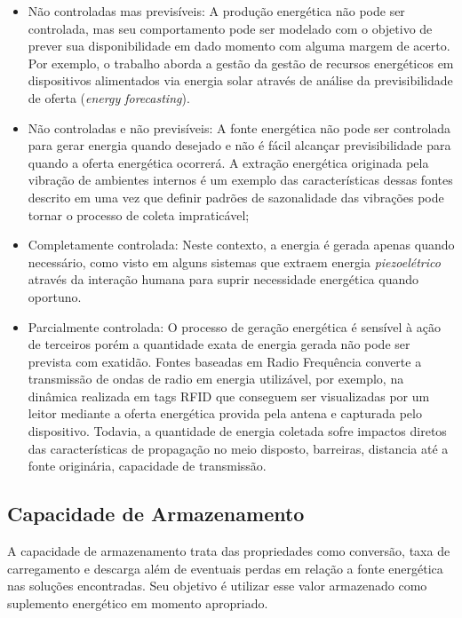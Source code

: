 \begin{itemize}

    \item Não controladas mas previsíveis: A produção energética não pode ser controlada, mas seu comportamento pode ser modelado com o objetivo de prever sua disponibilidade em dado momento com alguma margem de acerto. Por exemplo, o trabalho  \cite{lee_energy_2018} aborda a gestão da gestão de recursos energéticos em dispositivos alimentados via energia solar através de análise da previsibilidade de oferta (\textit{energy forecasting}).
    
    
    \item Não controladas e não previsíveis: A fonte energética não pode ser controlada para gerar energia quando desejado e não é fácil alcançar previsibilidade para quando a oferta energética ocorrerá. A extração energética originada pela vibração de ambientes internos é um exemplo das características dessas fontes descrito em \cite{wei_comprehensive_2017} uma vez que definir padrões de sazonalidade das vibrações pode tornar o processo de coleta impraticável;
    
    \item Completamente controlada: Neste contexto, a energia é gerada apenas quando necessário, como visto em alguns sistemas que extraem energia \textit{piezoelétrico} através da interação humana para suprir necessidade energética quando oportuno.
    
    \item Parcialmente controlada: O processo de geração energética é sensível à ação de terceiros porém a quantidade exata de energia gerada não pode ser prevista com exatidão. Fontes baseadas em Radio Frequência converte a transmissão de ondas de radio em energia utilizável, por exemplo, na dinâmica realizada em tags \acf{RFID} que conseguem ser visualizadas por um leitor mediante a oferta energética provida pela antena e capturada pelo dispositivo. Todavia, a quantidade de energia coletada sofre impactos diretos das características de propagação no meio disposto, barreiras, distancia até a fonte originária, capacidade de transmissão.
\end{itemize}

\subsection{Capacidade de Armazenamento}
\label{Capacidade de Armazenamento}
A capacidade de armazenamento trata das propriedades como conversão, taxa de carregamento e descarga além de eventuais perdas em relação a fonte energética nas soluções encontradas. Seu objetivo é utilizar esse valor armazenado como suplemento energético em  momento apropriado. 

